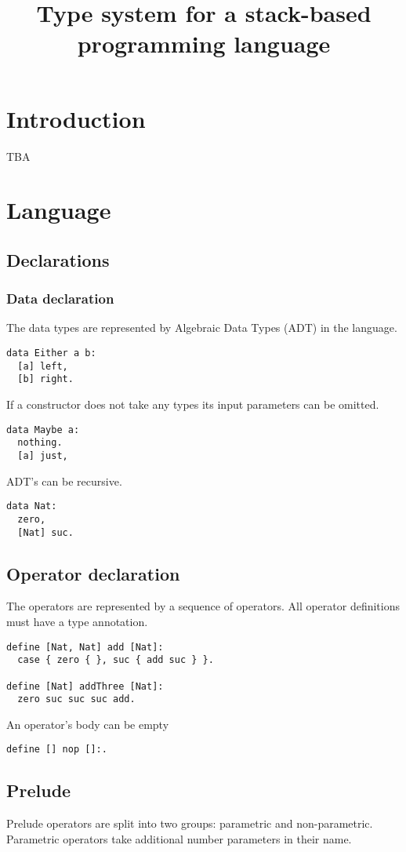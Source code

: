 \documentclass{article}
\title{Type system for a stack-based programming language}
\begin{document}
\maketitle

\section*{Introduction}
TBA

\section*{Language}

\subsection*{Declarations}

\subsubsection*{Data declaration}
The data types are represented by Algebraic Data Types (ADT) in the language.
\begin{verbatim}
data Either a b:
  [a] left,
  [b] right.
\end{verbatim}
If a constructor does not take any types its input parameters can be omitted.
\begin{verbatim}
data Maybe a:
  nothing.
  [a] just,
\end{verbatim}
ADT's can be recursive.
\begin{verbatim}
data Nat:
  zero,
  [Nat] suc.
\end{verbatim}

\subsection*{Operator declaration}
The operators are represented by a sequence of operators. All operator
definitions must have a type annotation.
\begin{verbatim}
define [Nat, Nat] add [Nat]:
  case { zero { }, suc { add suc } }.

define [Nat] addThree [Nat]:
  zero suc suc suc add.
\end{verbatim}
An operator's body can be empty
\begin{verbatim}
define [] nop []:.
\end{verbatim}

\subsection*{Prelude}
Prelude operators are split into two groups: parametric and non-parametric.
Parametric operators take additional number parameters in their name.
\end{document}
